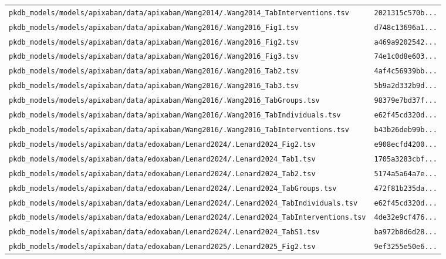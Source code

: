 \documentclass{article}
\begin{document}
\begin{longtable}{ll}
\texttt{pkdb\_models/models/apixaban/data/apixaban/Wang2014/.Wang2014\_TabInterventions.tsv} & \texttt{2021315c570b...} \\
\texttt{pkdb\_models/models/apixaban/data/apixaban/Wang2016/.Wang2016\_Fig1.tsv} & \texttt{d748c13696a1...} \\
\texttt{pkdb\_models/models/apixaban/data/apixaban/Wang2016/.Wang2016\_Fig2.tsv} & \texttt{a469a9202542...} \\
\texttt{pkdb\_models/models/apixaban/data/apixaban/Wang2016/.Wang2016\_Fig3.tsv} & \texttt{74e1c0d8e603...} \\
\texttt{pkdb\_models/models/apixaban/data/apixaban/Wang2016/.Wang2016\_Tab2.tsv} & \texttt{4af4c56939bb...} \\
\texttt{pkdb\_models/models/apixaban/data/apixaban/Wang2016/.Wang2016\_Tab3.tsv} & \texttt{5b9a2d332b9d...} \\
\texttt{pkdb\_models/models/apixaban/data/apixaban/Wang2016/.Wang2016\_TabGroups.tsv} & \texttt{98379e7bd37f...} \\
\texttt{pkdb\_models/models/apixaban/data/apixaban/Wang2016/.Wang2016\_TabIndividuals.tsv} & \texttt{e62f45cd320d...} \\
\texttt{pkdb\_models/models/apixaban/data/apixaban/Wang2016/.Wang2016\_TabInterventions.tsv} & \texttt{b43b26deb99b...} \\
\texttt{pkdb\_models/models/apixaban/data/edoxaban/Lenard2024/.Lenard2024\_Fig2.tsv} & \texttt{e908ecfd4200...} \\
\texttt{pkdb\_models/models/apixaban/data/edoxaban/Lenard2024/.Lenard2024\_Tab1.tsv} & \texttt{1705a3283cbf...} \\
\texttt{pkdb\_models/models/apixaban/data/edoxaban/Lenard2024/.Lenard2024\_Tab2.tsv} & \texttt{5174a5a64a7e...} \\
\texttt{pkdb\_models/models/apixaban/data/edoxaban/Lenard2024/.Lenard2024\_TabGroups.tsv} & \texttt{472f81b235da...} \\
\texttt{pkdb\_models/models/apixaban/data/edoxaban/Lenard2024/.Lenard2024\_TabIndividuals.tsv} & \texttt{e62f45cd320d...} \\
\texttt{pkdb\_models/models/apixaban/data/edoxaban/Lenard2024/.Lenard2024\_TabInterventions.tsv} & \texttt{4de32e9cf476...} \\
\texttt{pkdb\_models/models/apixaban/data/edoxaban/Lenard2024/.Lenard2024\_TabS1.tsv} & \texttt{ba972b8d6d28...} \\
\texttt{pkdb\_models/models/apixaban/data/edoxaban/Lenard2025/.Lenard2025\_Fig2.tsv} & \texttt{9ef3255e50e6...} \\

\end{longtable}
\end{document}
